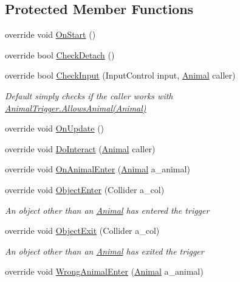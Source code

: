 \subsection*{Protected Member Functions}
\begin{DoxyCompactItemize}
\item 
override void \mbox{\hyperlink{class_trampoline_a8ca649f9cd7a2ec2510ab39888c3dd16}{On\+Start}} ()
\item 
override bool \mbox{\hyperlink{class_trampoline_a88fb0d537bb19917501307544d3e50b5}{Check\+Detach}} ()
\item 
override bool \mbox{\hyperlink{class_trampoline_a7cd4dba8195da3407019ef918daa1280}{Check\+Input}} (Input\+Control input, \mbox{\hyperlink{class_animal}{Animal}} caller)
\begin{DoxyCompactList}\small\item\em Default simply checks if the {\itshape caller}  works with \mbox{\hyperlink{class_animal_trigger_ae8394dfcf5f91b8c413959a4d6baa3a9}{Animal\+Trigger.\+Allows\+Animal(\+Animal)}} \end{DoxyCompactList}\item 
override void \mbox{\hyperlink{class_trampoline_acb12701ada778aa924cf51b892abc364}{On\+Update}} ()
\item 
override void \mbox{\hyperlink{class_trampoline_a37c1ae11b89a61be854133cfa1628572}{Do\+Interact}} (\mbox{\hyperlink{class_animal}{Animal}} caller)
\item 
override void \mbox{\hyperlink{class_trampoline_a593abd52ed17139a320ee418aff6b120}{On\+Animal\+Enter}} (\mbox{\hyperlink{class_animal}{Animal}} a\+\_\+animal)
\item 
override void \mbox{\hyperlink{class_trampoline_a82a3dc5c89e349b31def18b36ee1ad5a}{Object\+Enter}} (Collider a\+\_\+col)
\begin{DoxyCompactList}\small\item\em An object other than an \mbox{\hyperlink{class_animal}{Animal}} has entered the trigger \end{DoxyCompactList}\item 
override void \mbox{\hyperlink{class_trampoline_a3924d1f315181a81e2117ab239b8ec0e}{Object\+Exit}} (Collider a\+\_\+col)
\begin{DoxyCompactList}\small\item\em An object other than an \mbox{\hyperlink{class_animal}{Animal}} has exited the trigger \end{DoxyCompactList}\item 
override void \mbox{\hyperlink{class_trampoline_a7ffb817b148f86e9cc5dd7faa1af7c0c}{Wrong\+Animal\+Enter}} (\mbox{\hyperlink{class_animal}{Animal}} a\+\_\+animal)

\end{DoxyCompactItemize}
